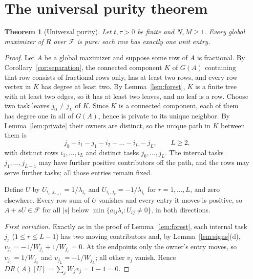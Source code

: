 \documentclass[11pt]{article}
\theoremstyle{plain}
\newtheorem{theorem}{Theorem}[section]
\theoremstyle{definition}
\theoremstyle{remark}
\newcommand{\Feas}{\mathcal{F}}
\begin{document}
\section{The universal purity theorem}\label{sec:purity}

\begin{theorem}[Universal purity]\label{thm:purity}
Let $t,\tau>0$ be finite and $N,M\ge1$. Every global maximizer of $R$ over $\Feas$ is pure: each row has exactly one unit entry.
\end{theorem}

\begin{proof}
Let $A$ be a global maximizer and suppose some row of $A$ is fractional. By Corollary~\ref{cor:separation}, the connected component $K$ of $G(A)$ containing that row consists of fractional rows only, has at least two rows, and every row vertex in $K$ has degree at least two. By Lemma~\ref{lem:forest}, $K$ is a finite tree with at least two edges, so it has at least two leaves, and no leaf is a row. Choose two task leaves $j_0\ne j_L$ of $K$. Since $K$ is a connected component, each of them has degree one in all of $G(A)$, hence is private to its unique neighbor. By Lemma~\ref{lem:private} their owners are distinct, so the unique path in $K$ between them is
\begin{equation}\label{eq:path}
 j_0-i_1-j_1-i_2-\dots-i_L-j_L,\qquad L\ge2,
\end{equation}
with distinct rows $i_1,\dots,i_L$ and distinct tasks $j_0,\dots,j_L$. The internal tasks $j_1,\dots,j_{L-1}$ may have further positive contributors off the path, and the rows may serve further tasks; all those entries remain fixed.

Define $U$ by $U_{i_r,j_{r-1}}=1/\lambda_{i_r}$ and $U_{i_r,j_r}=-1/\lambda_{i_r}$ for $r=1,\dots,L$, and zero elsewhere. Every row sum of $U$ vanishes and every entry it moves is positive, so $A+sU\in\Feas$ for all $|s|$ below $\min\{a_{ij}\lambda_i:U_{ij}\ne0\}$, in both directions.

\emph{First variation.} Exactly as in the proof of Lemma~\ref{lem:forest}, each internal task $j_r$ ($1\le r\le L-1$) has two moving contributors and, by Lemma~\ref{lem:signs}(d), $v_{j_r}=-1/W_{j_r}+1/W_{j_r}=0$. At the endpoints only the owner's entry moves, so $v_{j_0}=1/W_{j_0}$ and $v_{j_L}=-1/W_{j_L}$; all other $v_j$ vanish. Hence $DR(A)[U]=\sum_jW_jv_j=1-1=0$.


\end{proof}
\end{document}
